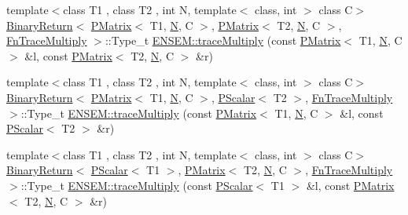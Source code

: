 \begin{DoxyCompactItemize}
{\footnotesize template$<$class T1 , class T2 , int N, template$<$ class, int $>$ class C$>$ }\\\mbox{\hyperlink{structENSEM_1_1BinaryReturn}{Binary\+Return}}$<$ \mbox{\hyperlink{classENSEM_1_1PMatrix}{P\+Matrix}}$<$ T1, \mbox{\hyperlink{adat__devel_2lib_2hadron_2operator__name__util_8cc_a7722c8ecbb62d99aee7ce68b1752f337}{N}}, C $>$, \mbox{\hyperlink{classENSEM_1_1PMatrix}{P\+Matrix}}$<$ T2, \mbox{\hyperlink{adat__devel_2lib_2hadron_2operator__name__util_8cc_a7722c8ecbb62d99aee7ce68b1752f337}{N}}, C $>$, \mbox{\hyperlink{structENSEM_1_1FnTraceMultiply}{Fn\+Trace\+Multiply}} $>$\+::Type\+\_\+t \mbox{\hyperlink{group__primmatrix_ga91e09af0f8d2d70627950b973f6b41ec}{E\+N\+S\+E\+M\+::trace\+Multiply}} (const \mbox{\hyperlink{classENSEM_1_1PMatrix}{P\+Matrix}}$<$ T1, \mbox{\hyperlink{adat__devel_2lib_2hadron_2operator__name__util_8cc_a7722c8ecbb62d99aee7ce68b1752f337}{N}}, C $>$ \&l, const \mbox{\hyperlink{classENSEM_1_1PMatrix}{P\+Matrix}}$<$ T2, \mbox{\hyperlink{adat__devel_2lib_2hadron_2operator__name__util_8cc_a7722c8ecbb62d99aee7ce68b1752f337}{N}}, C $>$ \&r)
\item 
{\footnotesize template$<$class T1 , class T2 , int N, template$<$ class, int $>$ class C$>$ }\\\mbox{\hyperlink{structENSEM_1_1BinaryReturn}{Binary\+Return}}$<$ \mbox{\hyperlink{classENSEM_1_1PMatrix}{P\+Matrix}}$<$ T1, \mbox{\hyperlink{adat__devel_2lib_2hadron_2operator__name__util_8cc_a7722c8ecbb62d99aee7ce68b1752f337}{N}}, C $>$, \mbox{\hyperlink{classENSEM_1_1PScalar}{P\+Scalar}}$<$ T2 $>$, \mbox{\hyperlink{structENSEM_1_1FnTraceMultiply}{Fn\+Trace\+Multiply}} $>$\+::Type\+\_\+t \mbox{\hyperlink{group__primmatrix_gac4a39563bd9c9b587bd894f97f9e3fc4}{E\+N\+S\+E\+M\+::trace\+Multiply}} (const \mbox{\hyperlink{classENSEM_1_1PMatrix}{P\+Matrix}}$<$ T1, \mbox{\hyperlink{adat__devel_2lib_2hadron_2operator__name__util_8cc_a7722c8ecbb62d99aee7ce68b1752f337}{N}}, C $>$ \&l, const \mbox{\hyperlink{classENSEM_1_1PScalar}{P\+Scalar}}$<$ T2 $>$ \&r)
\item 
{\footnotesize template$<$class T1 , class T2 , int N, template$<$ class, int $>$ class C$>$ }\\\mbox{\hyperlink{structENSEM_1_1BinaryReturn}{Binary\+Return}}$<$ \mbox{\hyperlink{classENSEM_1_1PScalar}{P\+Scalar}}$<$ T1 $>$, \mbox{\hyperlink{classENSEM_1_1PMatrix}{P\+Matrix}}$<$ T2, \mbox{\hyperlink{adat__devel_2lib_2hadron_2operator__name__util_8cc_a7722c8ecbb62d99aee7ce68b1752f337}{N}}, C $>$, \mbox{\hyperlink{structENSEM_1_1FnTraceMultiply}{Fn\+Trace\+Multiply}} $>$\+::Type\+\_\+t \mbox{\hyperlink{group__primmatrix_ga5b0cf4c87cad1bfd7dcad0a42d0b4ae6}{E\+N\+S\+E\+M\+::trace\+Multiply}} (const \mbox{\hyperlink{classENSEM_1_1PScalar}{P\+Scalar}}$<$ T1 $>$ \&l, const \mbox{\hyperlink{classENSEM_1_1PMatrix}{P\+Matrix}}$<$ T2, \mbox{\hyperlink{adat__devel_2lib_2hadron_2operator__name__util_8cc_a7722c8ecbb62d99aee7ce68b1752f337}{N}}, C $>$ \&r)

\end{DoxyCompactItemize}
